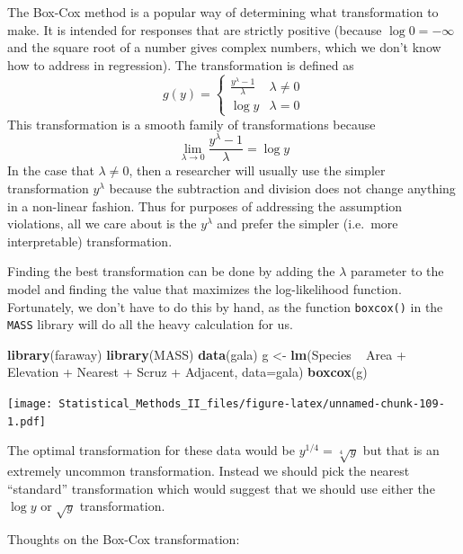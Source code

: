 \documentclass[]{book}
\newenvironment{Shaded}{\begin{snugshade}}{\end{snugshade}}
\newcommand{\KeywordTok}[1]{\textcolor[rgb]{0.13,0.29,0.53}{\textbf{{#1}}}}
\newcommand{\DataTypeTok}[1]{\textcolor[rgb]{0.13,0.29,0.53}{{#1}}}
\newcommand{\StringTok}[1]{\textcolor[rgb]{0.31,0.60,0.02}{{#1}}}
\newcommand{\NormalTok}[1]{{#1}}
\theoremstyle{definition}
\theoremstyle{definition}
\theoremstyle{remark}
\begin{document}
The Box-Cox method is a popular way of determining what transformation
to make. It is intended for responses that are strictly positive
(because \(\log0=-\infty\) and the square root of a number gives complex
numbers, which we don't know how to address in regression). The
transformation is defined as \[g\left(y\right)=\begin{cases}
\frac{y^{\lambda}-1}{\lambda} & \lambda\ne0\\
\log y & \lambda=0
\end{cases}\] This transformation is a smooth family of transformations
because \[\lim_{\lambda\to0}\frac{y^{\lambda}-1}{\lambda}=\log y\] In
the case that \(\lambda\ne 0\), then a researcher will usually use the
simpler transformation \(y^{\lambda}\) because the subtraction and
division does not change anything in a non-linear fashion. Thus for
purposes of addressing the assumption violations, all we care about is
the \(y^{\lambda}\) and prefer the simpler (i.e.~more interpretable)
transformation.

Finding the best transformation can be done by adding the \(\lambda\)
parameter to the model and finding the value that maximizes the
log-likelihood function. Fortunately, we don't have to do this by hand,
as the function \texttt{boxcox()} in the \texttt{MASS} library will do
all the heavy calculation for us.

\begin{Shaded}
\begin{Highlighting}[]
\KeywordTok{library}\NormalTok{(faraway)}
\KeywordTok{library}\NormalTok{(MASS)}
\KeywordTok{data}\NormalTok{(gala)}
\NormalTok{g <-}\StringTok{ }\KeywordTok{lm}\NormalTok{(Species ~}\StringTok{ }\NormalTok{Area +}\StringTok{ }\NormalTok{Elevation +}\StringTok{ }\NormalTok{Nearest +}\StringTok{ }\NormalTok{Scruz +}\StringTok{ }\NormalTok{Adjacent, }\DataTypeTok{data=}\NormalTok{gala)}
\KeywordTok{boxcox}\NormalTok{(g)}
\end{Highlighting}
\end{Shaded}

\texttt{[image: Statistical\_Methods\_II\_files/figure-latex/unnamed-chunk-109-1.pdf]}

The optimal transformation for these data would be
\(y^{1/4}=\sqrt[4]{y}\) but that is an extremely uncommon
transformation. Instead we should pick the nearest ``standard''
transformation which would suggest that we should use either the
\(\log y\) or \(\sqrt{y}\) transformation.

Thoughts on the Box-Cox transformation:
\end{document}
